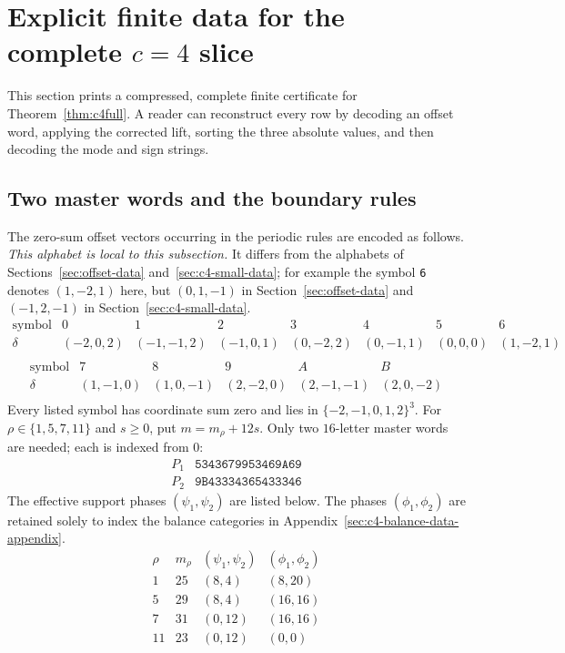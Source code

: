 \section{Explicit finite data for the complete \texorpdfstring{$c=4$}{c=4} slice}\label{sec:c4-data}
This section prints a compressed, complete finite certificate for
Theorem~\ref{thm:c4full}.  A reader can reconstruct every row by decoding an offset
word, applying the corrected lift, sorting the three absolute values, and then decoding
the mode and sign strings.

\subsection{Two master words and the boundary rules}\label{sec:c4-support-data}
The zero-sum offset vectors occurring in the periodic rules are encoded as follows.
\emph{This alphabet is local to this subsection.} It differs from the alphabets of
Sections~\ref{sec:offset-data} and~\ref{sec:c4-small-data}; for example the symbol \texttt{6}
denotes \((1,-2,1)\) here, but \((0,1,-1)\) in Section~\ref{sec:offset-data} and
\((-1,2,-1)\) in Section~\ref{sec:c4-small-data}.
\begingroup\scriptsize\[
\begin{array}{c|ccccccc}
\text{symbol}&0&1&2&3&4&5&6\\\hline
\delta&(-2,0,2)&(-1,-1,2)&(-1,0,1)&(0,-2,2)&(0,-1,1)&(0,0,0)&(1,-2,1)\\
\end{array}\]\endgroup
\begingroup\scriptsize\[
\begin{array}{c|ccccc}
\text{symbol}&7&8&9&A&B\\\hline
\delta&(1,-1,0)&(1,0,-1)&(2,-2,0)&(2,-1,-1)&(2,0,-2)\\
\end{array}\]\endgroup
Every listed symbol has coordinate sum zero and lies in
$\{-2,-1,0,1,2\}^3$.
For $\rho\in\{1,5,7,11\}$ and $s\ge0$, put $m=m_\rho+12s$.
Only two $16$-letter master words are needed; each is indexed from $0$:
\[\begin{array}{c|l}
P_1&\texttt{5343679953469A69}\\
P_2&\texttt{9B43334365433346}
\end{array}\]
The effective support phases $(\psi_1,\psi_2)$ are listed below. The phases
$(\phi_1,\phi_2)$ are retained solely to index the balance categories in
Appendix~\ref{sec:c4-balance-data-appendix}.
\[\begin{array}{c|c|c|c}
\rho&m_\rho&(\psi_1,\psi_2)&(\phi_1,\phi_2)\\\hline
1&25&(8,4)&(8,20)\\
5&29&(8,4)&(16,16)\\
7&31&(0,12)&(16,16)\\
11&23&(0,12)&(0,0)\\
\end{array}\]
